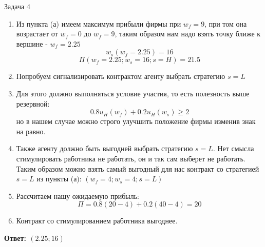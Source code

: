 \begin{mybox}{Задача 4}
\begin{enumerate}
$$\begin{gathered}
              \frac{1}{3}*\sqrt{w_f}\leq-7.5 \\
          \end{gathered}
        \right.$$
        $$\sqrt{w_f}\leq1.5$$
        $$\begin{cases}
            w_f\leq2.25 \\
            w_f\geq0 \\
        \end{cases}$$
        \item Из пункта (а) имеем максимум прибыли фирмы при $w_f=9$, при том она возрастает от $w_f=0$ до $w_f=9$,
        таким образом нам надо взять точку ближе к вершине - $w_f=2.25$
        $$w_s(w_f=2.25)=16$$
        $$\Pi(w_f=2.25;w_s=16;s=H)=21.5$$
        \item Попробуем сигнализировать контрактом агенту выбрать стратегию $s=L$
        \item Для этого должно выполняться условие участия, то есть полезность выше резервной: $$0.8u_H(w_f)+0.2u_H(
        w_s)\geq2$$ но в нашем случае можно строго улучшить положение фирмы изменив знак на равно.
        \item Также агенту должно быть выгодней выбрать стратегию $s=L$. Нет смысла стимулировать работника
        не работать, он и так сам выберет не работать. Таким
        образом можно взять самый выгодный для нас контракт со стратегией $s=L$ из пункты (а): $(w_f=4; w_s=4; s=L)$
        \item Рассчитаем нашу ожидаемую прибыль: $$\Pi=0.8(20-4)+0.2(40-4)=20$$
        \item Контракт со стимулированием работника выгоднее.
    \end{enumerate}
    \textbf{Ответ: $(2.25;16)$}
\end{mybox}

